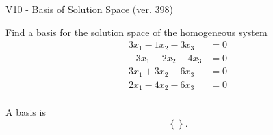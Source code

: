 \begin{exercise}
  \begin{exerciseTitle}V10 - Basis of Solution Space (ver. 398)\end{exerciseTitle}
  \begin{exerciseStatement}
    Find a basis for the solution space of the homogeneous system 
\begin{align*}
 3 x_ 1 -1 x_ 2 -3 x_ 3 &= 0  \\ 
  -3 x_ 1 -2 x_ 2 -4 x_ 3 &= 0  \\ 
  3 x_ 1 + 3 x_ 2 -6 x_ 3 &= 0  \\ 
  2 x_ 1 -4 x_ 2 -6 x_ 3 &= 0  \\ 
 \end{align*}


 
  \end{exerciseStatement}

  \begin{exerciseAnswer}
   A basis is   
\[\left\{\right\}.\]

  


  \end{exerciseAnswer}
\end{exercise}